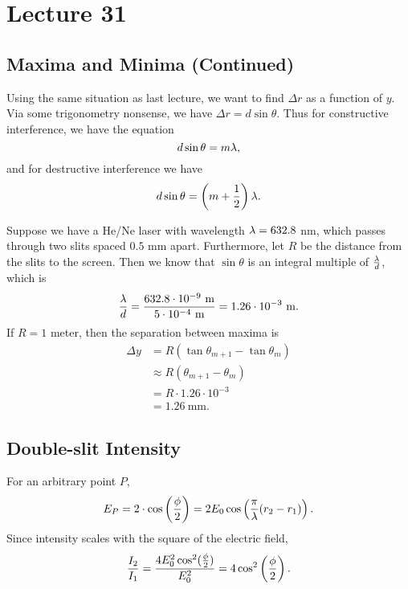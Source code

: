 \documentclass[class=article, crop=false]{standalone}
\begin{document}
  \section{Lecture 31}
  \subsection{Maxima and Minima (Continued)}
  Using the same situation as last lecture, we want to find $\Delta r$ as a function of $y$. Via some trigonometry nonsense, we have $\Delta r = d\sin\theta$. Thus for constructive interference, we have the equation
  \[
    d\sin\theta = m\lambda,
  \]
  and for destructive interference we have
  \[
    d\sin\theta = \left( m+\frac{1}{2} \right)\lambda.
  \]
  \begin{example}{}
    Suppose we have a He/Ne laser with wavelength $\lambda = 632.8$ nm, which passes through two slits spaced $0.5$ mm apart. Furthermore, let $R$ be the distance from the slits to the screen. Then we know that $\sin\theta$ is an integral multiple of $\frac{\lambda}{d}$, which is
    \[
      \frac{\lam}{d} = \frac{632.8\cdot 10^{-9}\ \mathrm{m}}{5\cdot 10^{-4}\ \mathrm{m}} = 1.26\cdot 10^{-3}\ \mathrm{m}.
    \]
    If $R = 1$ meter, then the separation between maxima is
    \begin{align*}
      \Delta y &= R(\tan\theta_{m+1} - \tan\theta_m) \\
               &\approx R(\theta_{m+1}-\theta_m) \tag{Small angle} \\
               &= R\cdot 1.26\cdot 10^{-3} \\
               &= 1.26\ \mathrm{mm}.
    \end{align*}
  \end{example}
  \subsection{Double-slit Intensity}
  For an arbitrary point $P$,
  \[
    E_P = 2\cdot \cos\left( \frac{\phi}{2} \right) = 2E_0\cos\left( \frac{\pi}{\lambda}(r_2-r_1) \right).
  \]
  Since intensity scales with the square of the electric field,
  \[
    \frac{I_2}{I_1} = \frac{4E_0^2\cos^2(\frac{\phi}{2})}{E_0^2} = 4\cos^2\left( \frac{\phi}{2} \right).
  \]
\end{document}
